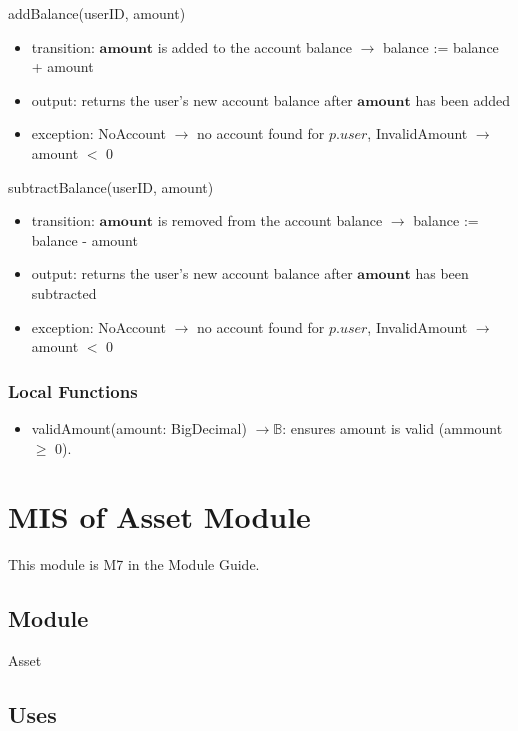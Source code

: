 \documentclass[12pt, titlepage]{article}
\begin{document}
\noindent addBalance(userID, amount)
\begin{itemize}
    \item transition: $\mathbf{amount}$ is added to the account balance $\longrightarrow$ balance := balance + amount
    \item output: returns the user's new account balance after $\mathbf{amount}$ has been added
    \item exception: NoAccount $\longrightarrow$ no account found for $p.\mathit{user}$, InvalidAmount $\longrightarrow$ amount $<$ 0
\end{itemize}

\noindent subtractBalance(userID, amount)
\begin{itemize}
    \item transition: $\mathbf{amount}$ is removed from the account balance $\longrightarrow$ balance := balance - amount
    \item output: returns the user's new account balance after $\mathbf{amount}$ has been subtracted
    \item exception: NoAccount $\longrightarrow$ no account found for $p.\mathit{user}$, InvalidAmount $\longrightarrow$ amount $<$ 0
\end{itemize}

\subsubsection{Local Functions}
\begin{itemize}
    \item validAmount(amount: BigDecimal) $\longrightarrow \mathbb{B}$: ensures amount is valid (ammount $\geq$ 0). 
\end{itemize}

\section{MIS of Asset Module} \label{misAsset}

This module is M7 in the Module Guide.

\subsection{Module}

Asset

\subsection{Uses}
\end{document}
